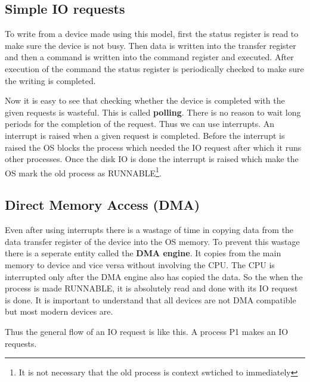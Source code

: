 \documentclass[12pt]{article}
\begin{document}
\subsection{Simple IO requests}
To write from a device made using this model, first the status register is read to make sure the device is not busy. 
Then data is written into the transfer register and then a command is written into the command register and executed. After execution of the
command the status register is periodically checked to make sure the writing is completed. 

Now it is easy to see that checking whether the device is completed with the given requests is 
wasteful. This is called \textbf{polling}. There is no reason to wait long periods for the completion of the request. 
Thus we can use interrupts. An interrupt is raised when a given request is completed. Before the interrupt is raised the OS blocks the process which needed the IO request
after which it runs other processes. Once the disk IO is done the interrupt is raised which make the OS mark the old process as RUNNABLE\footnote{It is not necessary that the old process is context swtiched to immediately}.

\subsection{Direct Memory Access (DMA)}
Even after using interrupts there is a wastage of time in copying data from the data transfer register of the device into the OS memory. 
To prevent this wastage there is a seperate entity called the \textbf{DMA engine}. It copies from the main memory to device and vice versa without involving the CPU. 
The CPU is interrupted only after the DMA engine also has copied the data. So the when the process is made RUNNABLE, it is absolutely read and done with its IO request is done. It is important to 
understand that all devices are not DMA compatible but most modern devices are.  


Thus the general flow of an IO request is like this. 
A process P1 makes an IO requests. 


\end{document}
